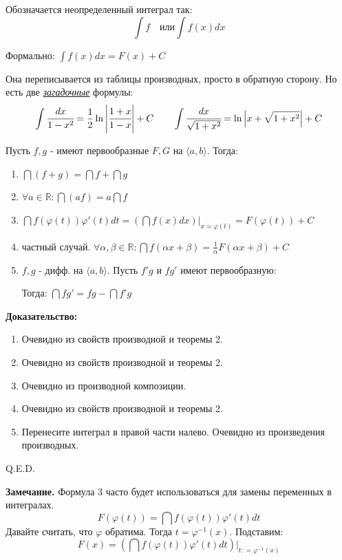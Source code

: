 Обозначается неопределенный интеграл так:
$$\int f \quad \text{или} \int f(x) dx $$

Формально: $\displaystyle \int f(x)dx = F(x) +C$


Она переписывается из таблицы производных, просто в обратную сторону. Но есть две \uline{\emph{загадочные}} формулы:
     $$\displaystyle \int \cfrac{dx}{1-x^2} = \frac{1}{2}\ln \left|\cfrac{1+x}{1-x}\right| + C \quad \quad \int \cfrac{dx}{\sqrt{1+x^2}} = \ln \left|x + \sqrt{1+x^2}\right| + C$$


Пусть $f,g$ - имеют первообразные $F,G$ на $\langle a,b \rangle$. Тогда:

\begin{enumerate}
    \item $\dint (f+g) = \dint f + \dint g$
    \item $\forall a \in \mathbb{R}: \dint (af)=a\dint f$
    \item $\dint f(\varphi(t))\varphi'(t)dt = \left(\dint f(x)dx\right)\Big |_{x=\varphi(t)}= F(\varphi(t)) + C$
    \item частный случай. $\forall \alpha,\beta \in \mathbb{R}:\dint f(\alpha x + \beta) = \frac{1}{\alpha}F(\alpha x+\beta) + C$
    \item $f,g$ - дифф. на $\langle a,b\rangle$. Пусть $f'g$ и $fg'$ имеют первообразную: 
    
    Тогда: $\dint f g' = fg -\dint f'g$
\end{enumerate}

\textbf{Доказательство:}
\begin{enumerate}
    \item Очевидно из свойств производной и теоремы 2.
    \item Очевидно из свойств производной и теоремы 2.
    \item Очевидно из производной композиции.
    \item Очевидно из свойств производной и теоремы 2.
    \item Перенесите интеграл в правой части налево. Очевидно из произведения производных.
\end{enumerate}
    \hfill Q.E.D.

\textbf{Замечание.} Формула 3 часто будет использоваться для замены переменных в интегралах.
$$F(\varphi(t)) = \dint f(\varphi(t))\varphi'(t)dt $$
Давайте считать, что $\varphi $ обратима. Тогда $t = \varphi^{-1}(x)$. Подставим:
$$F(x)=\left(\dint f(\varphi(t))\varphi'(t)dt\right)\Big|_{t: = \varphi^{-1}(x)} $$

